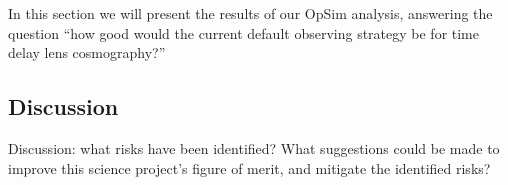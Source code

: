 
In this section we will present the results of our OpSim analysis,
answering the question ``how good would the current default observing
strategy be for time delay lens cosmography?''


\subsection{Discussion}
\label{sec:lenstimedelays:discussion}

Discussion: what risks have been identified? What suggestions could be
made to improve this science project's figure of merit, and mitigate
the identified risks?


